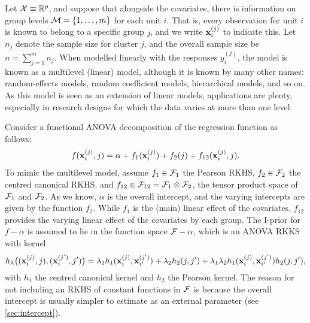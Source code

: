 Let ${\mathcal X}\equiv\mathbb{R}^p$, and suppose that alongside the covariates, there is information on group levels ${\mathcal M}= \{1,\dots,m\}$ for each unit $i$.
That is, every observation for unit $i$ is known to belong to a specific group $j$, and we write ${\mathbf x}_i^{(j)}$ to indicate this.
Let $n_j$ denote the sample size for cluster $j$, and the overall sample size be $n = \sum_{j=1}^m n_j$.
When modelled linearly with the responses $y_i^{(j)}$, the model is known as a multilevel (linear) model, although it is known by many other names: random-effects models, random coefficient models, hierarchical models, and so on.
As this model is seen as an extension of linear models, applications are plenty, especially in research designs for which the data varies at more than one level.

Consider a functional ANOVA decomposition of the regression function as follows:
\begin{align}\label{eq:anovamultilevel}
  f({\mathbf x}_i^{(j)}, j) = \alpha + f_1({\mathbf x}_i^{(j)}) + f_2(j) + f_{12}({\mathbf x}_i^{(j)}, j).  
\end{align}
To mimic the multilevel model, assume $f_1\in{\mathcal F}_1$ the Pearson RKHS, $f_2\in{\mathcal F}_2$ the centred canonical RKHS, and $f_{12} \in {\mathcal F}_{12} = {\mathcal F}_1 \otimes {\mathcal F}_2$, the tensor product space of ${\mathcal F}_1$ and ${\mathcal F}_2$.
As we know, $\alpha$ is the overall intercept, and the varying intercepts are given by the function $f_2$.
While $f_1$ is the (main) linear effect of the covariates, $f_{12}$ provides the varying linear effect of the covariates by each group.
The I-prior for $f-\alpha$ is assumed to lie in the function space ${\mathcal F}-\alpha$, which is an ANOVA RKKS with kernel
\[
  h_\lambda\big(({\mathbf x}_i^{(j)},j),({\mathbf x}_i^{(j')},j')\big) = \lambda_1 h_1({\mathbf x}_i^{(j)},{\mathbf x}_{i'}^{(j')}) + \lambda_2 h_2(j,j') + \lambda_1\lambda_2 h_1({\mathbf x}_i^{(j)},{\mathbf x}_{i'}^{(j')})h_2(j,j'),
\]
with $h_1$ the centred canonical kernel and $h_2$ the Pearson kernel.
The reason for not including an RKHS of constant functions in ${\mathcal F}$ is because the overall intercept is usually simpler to estimate as an external parameter (see \cref{sec:intercept}).

